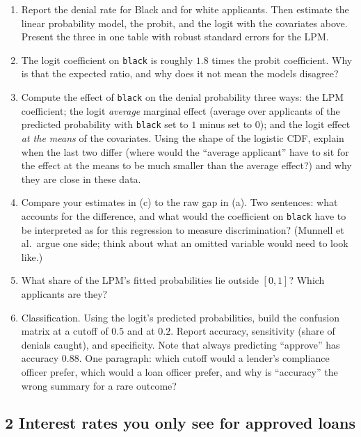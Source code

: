 \documentclass[11pt]{article}
\begin{document}
\begin{enumerate}[label=(\alph*)]
\item Report the denial rate for Black and for white applicants. Then estimate the linear
probability model, the probit, and the logit with the covariates above. Present the three in one
table with robust standard errors for the LPM.
\item The logit coefficient on \texttt{black} is roughly $1.8$ times the probit coefficient. Why is that
the expected ratio, and why does it not mean the models disagree?
\item Compute the effect of \texttt{black} on the denial probability three ways: the LPM coefficient;
the logit \emph{average} marginal effect (average over applicants of the predicted probability with
\texttt{black} set to $1$ minus set to $0$); and the logit effect \emph{at the means} of the
covariates. Using the shape of the logistic CDF, explain when the last two differ (where would the
``average applicant'' have to sit for the effect at the means to be much smaller than the average
effect?) and why they are close in these data.
\item Compare your estimates in (c) to the raw gap in (a). Two sentences: what accounts for the
difference, and what would the coefficient on \texttt{black} have to be interpreted as for this
regression to measure discrimination? (Munnell et al.\ argue one side; think about what an
omitted variable would need to look like.)
\item What share of the LPM's fitted probabilities lie outside $[0, 1]$? Which applicants are they?
\item Classification. Using the logit's predicted probabilities, build the confusion matrix at a
cutoff of $0.5$ and at $0.2$. Report accuracy, sensitivity (share of denials caught), and
specificity. Note that always predicting ``approve'' has accuracy $0.88$. One paragraph: which
cutoff would a lender's compliance officer prefer, which would a loan officer prefer, and why is
``accuracy'' the wrong summary for a rare outcome?
\end{enumerate}

\subsection*{2 Interest rates you only see for approved loans}
\end{document}
